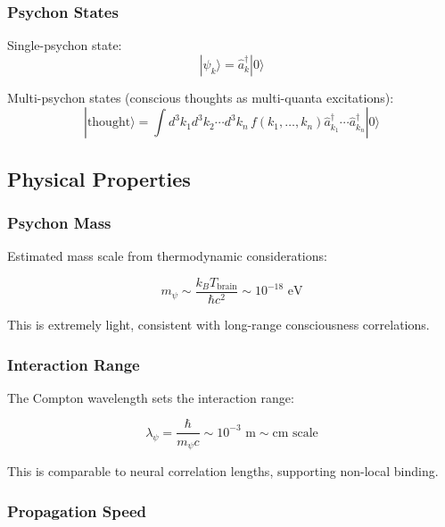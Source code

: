 \subsubsection{Psychon States}

Single-psychon state:
\begin{equation}
|\psi_k\rangle = \hat{a}_k^\dagger |0\rangle
\end{equation}

Multi-psychon states (conscious thoughts as multi-quanta excitations):
\begin{equation}
|\text{thought}\rangle = \int d^3k_1 d^3k_2 \cdots d^3k_n \, f(k_1, \ldots, k_n) \hat{a}_{k_1}^\dagger \cdots \hat{a}_{k_n}^\dagger |0\rangle
\end{equation}

\subsection{Physical Properties}

\subsubsection{Psychon Mass}

Estimated mass scale from thermodynamic considerations:

\begin{equation}
m_\psi \sim \frac{k_B T_{\text{brain}}}{\hbar c^2} \sim 10^{-18} \text{ eV}
\end{equation}

This is extremely light, consistent with long-range consciousness correlations.

\subsubsection{Interaction Range}

The Compton wavelength sets the interaction range:

\begin{equation}
\lambda_\psi = \frac{\hbar}{m_\psi c} \sim 10^{-3} \text{ m} \sim \text{cm scale}
\end{equation}

This is comparable to neural correlation lengths, supporting non-local binding.

\subsubsection{Propagation Speed}

